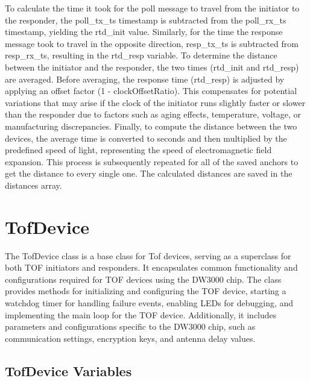 To calculate the time it took for the poll message to travel from the initiator to the responder, the poll\_tx\_ts timestamp is subtracted from the poll\_rx\_ts timestamp, yielding the rtd\_init value. Similarly, for the time the response message took to travel in the opposite direction, resp\_tx\_ts is subtracted from resp\_rx\_ts, resulting in the rtd\_resp variable.
\vspace{4pt}
\newline
To determine the distance between the initiator and the responder, the two times (rtd\_init and rtd\_resp) are averaged. Before averaging, the response time (rtd\_resp) is adjusted by applying an offset factor (1 - clockOffsetRatio). This compensates for potential variations that may arise if the clock of the initiator runs slightly faster or slower than the responder due to factors such as aging effects, temperature, voltage, or manufacturing discrepancies.
\vspace{4pt}
\newline
Finally, to compute the distance between the two devices, the average time is converted to seconds and then multiplied by the predefined speed of light, representing the speed of electromagnetic field expansion.
\vspace{4pt}
\newline
This process is subsequently repeated for all of the saved anchors to get the distance to every single one. 
The calculated distances are saved in the distances array. 



\section{TofDevice}
\label{sec:TofDevice}
The TofDevice class is a base class for Tof devices, serving as a superclass for both TOF initiators and responders. 
It encapsulates common functionality and configurations required for TOF devices using the DW3000 chip.
The class provides methods for initializing and configuring the TOF device, starting a watchdog timer for handling failure events, enabling LEDs for debugging, and implementing the main loop for the TOF device.
Additionally, it includes parameters and configurations specific to the DW3000 chip, such as communication settings, encryption keys, and antenna delay values.

\subsection{TofDevice Variables}
\label{subsec:TofDevice_Variables}

